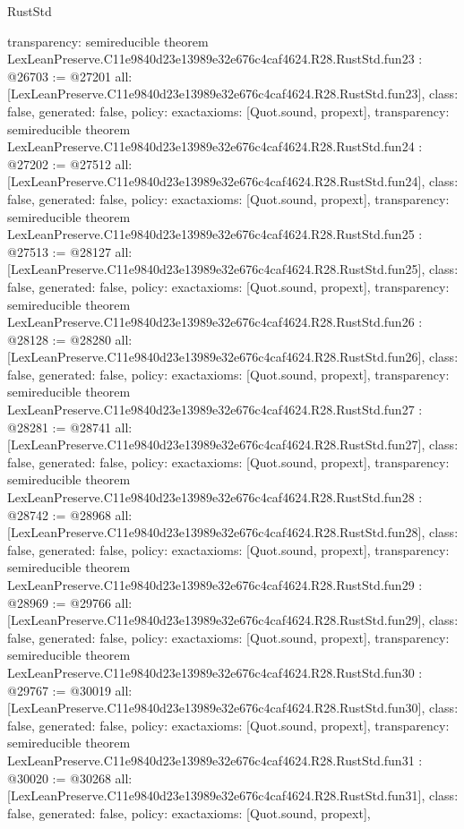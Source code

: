 \begin{lexlean}{RustStd}
\begin{coremodule}
{  transparency: semireducible
}
theorem LexLeanPreserve.C11e9840d23e13989e32e676c4caf4624.R28.RustStd.fun23 : @26703 := @27201 {
  all: [LexLeanPreserve.C11e9840d23e13989e32e676c4caf4624.R28.RustStd.fun23],
  class: false,
  generated: false,
  policy: exact{axioms: [Quot.sound, propext]},
  transparency: semireducible
}
theorem LexLeanPreserve.C11e9840d23e13989e32e676c4caf4624.R28.RustStd.fun24 : @27202 := @27512 {
  all: [LexLeanPreserve.C11e9840d23e13989e32e676c4caf4624.R28.RustStd.fun24],
  class: false,
  generated: false,
  policy: exact{axioms: [Quot.sound, propext]},
  transparency: semireducible
}
theorem LexLeanPreserve.C11e9840d23e13989e32e676c4caf4624.R28.RustStd.fun25 : @27513 := @28127 {
  all: [LexLeanPreserve.C11e9840d23e13989e32e676c4caf4624.R28.RustStd.fun25],
  class: false,
  generated: false,
  policy: exact{axioms: [Quot.sound, propext]},
  transparency: semireducible
}
theorem LexLeanPreserve.C11e9840d23e13989e32e676c4caf4624.R28.RustStd.fun26 : @28128 := @28280 {
  all: [LexLeanPreserve.C11e9840d23e13989e32e676c4caf4624.R28.RustStd.fun26],
  class: false,
  generated: false,
  policy: exact{axioms: [Quot.sound, propext]},
  transparency: semireducible
}
theorem LexLeanPreserve.C11e9840d23e13989e32e676c4caf4624.R28.RustStd.fun27 : @28281 := @28741 {
  all: [LexLeanPreserve.C11e9840d23e13989e32e676c4caf4624.R28.RustStd.fun27],
  class: false,
  generated: false,
  policy: exact{axioms: [Quot.sound, propext]},
  transparency: semireducible
}
theorem LexLeanPreserve.C11e9840d23e13989e32e676c4caf4624.R28.RustStd.fun28 : @28742 := @28968 {
  all: [LexLeanPreserve.C11e9840d23e13989e32e676c4caf4624.R28.RustStd.fun28],
  class: false,
  generated: false,
  policy: exact{axioms: [Quot.sound, propext]},
  transparency: semireducible
}
theorem LexLeanPreserve.C11e9840d23e13989e32e676c4caf4624.R28.RustStd.fun29 : @28969 := @29766 {
  all: [LexLeanPreserve.C11e9840d23e13989e32e676c4caf4624.R28.RustStd.fun29],
  class: false,
  generated: false,
  policy: exact{axioms: [Quot.sound, propext]},
  transparency: semireducible
}
theorem LexLeanPreserve.C11e9840d23e13989e32e676c4caf4624.R28.RustStd.fun30 : @29767 := @30019 {
  all: [LexLeanPreserve.C11e9840d23e13989e32e676c4caf4624.R28.RustStd.fun30],
  class: false,
  generated: false,
  policy: exact{axioms: [Quot.sound, propext]},
  transparency: semireducible
}
theorem LexLeanPreserve.C11e9840d23e13989e32e676c4caf4624.R28.RustStd.fun31 : @30020 := @30268 {
  all: [LexLeanPreserve.C11e9840d23e13989e32e676c4caf4624.R28.RustStd.fun31],
  class: false,
  generated: false,
  policy: exact{axioms: [Quot.sound, propext]},
}
\end{coremodule}
\end{lexlean}
